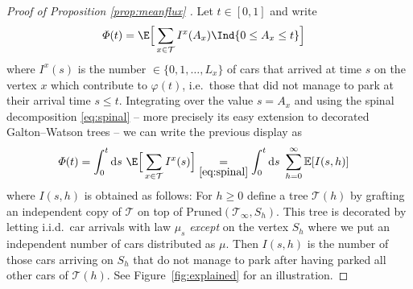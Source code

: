  
\begin{proof}[Proof of Proposition \ref{prop:meanflux} ]
Let $t \in [0,1]$ and write 
 \begin{align*}
\varPhi(t)& = \E\Big[ \sum_{x \in \mathcal{T}} I^{x}(A_x) \Ind{0 \leq A_x \leq t } \Big]  \end{align*}
 where $I^{x}(s)$ is the number $\in \{0,1, \dots , L_{x}\}$  of cars that arrived at time $s$ on the vertex $x$ which contribute to $\varphi(t)$, i.e.~those that did not manage to park at their arrival time $s \leq t$. Integrating over the value $s=A_x$ and using the spinal decomposition \eqref{eq:spinal} -- more precisely its easy extension to decorated Galton--Watson trees -- we can write the previous display as 
 \begin{align}
\label{eq:spinal1} \varPhi(t) &  =    
\int_{0}^{t} \mathrm{d}s \ \E\Big[ \sum_{x \in \mathcal{T}} I^{x}(s) \Big]  \underset{ \eqref{eq:spinal}}{=}   \int_{0}^{t} \mathrm{d}s \ \sum_{h =0}^{\infty}\mathbb{E}[ I(s,h)]  \end{align}
 where $I(s,h)$ is obtained as follows: For $h \geq 0$ define a tree $ \mathcal{T}(h)$ by grafting an independent copy of $ \mathcal{T}$ on top of $ \mathrm{Pruned}( \mathcal{T}_{\infty}, S_{h})$. This tree is decorated by letting i.i.d.~car arrivals with law $\mu_{s}$ \emph{except} on the vertex $S_{h}$ where we put an independent number of cars distributed as $\mu$. Then $I(s,h)$ is the number of those cars arriving on $ S_{h}$ that do not manage to park after having parked all other cars of $ \mathcal{T}(h)$. See Figure~\ref{fig:explained} for an illustration. 
 

\end{proof}
